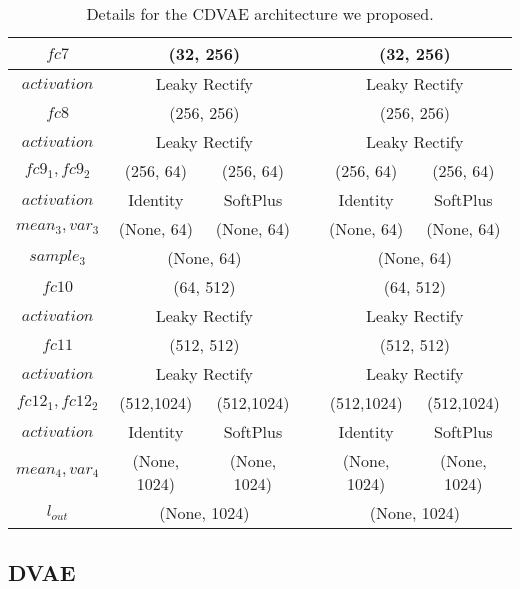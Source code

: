 \documentclass[10pt,twocolumn,letterpaper]{article}
\begin{document}
\begin{table*}
{\begin{tabular}{ | c | c | c | c | c | c |}
  \hline
   $fc7$ & \multicolumn{2}{|c|}{(32, 256)} &  & \multicolumn{2}{|c|}{(32, 256)} \\
  \hline
   $activation$ & \multicolumn{2}{|c|}{Leaky Rectify} &  & \multicolumn{2}{|c|}{Leaky Rectify} \\
  \hline
   $fc8$ & \multicolumn{2}{|c|}{(256, 256)} &  & \multicolumn{2}{|c|}{(256, 256)} \\
  \hline
   $activation$ & \multicolumn{2}{|c|}{Leaky Rectify} &  & \multicolumn{2}{|c|}{Leaky Rectify} \\
  \hline
   $fc9_1, fc9_2$ & (256, 64) & (256, 64) &  &  (256, 64) & (256, 64) \\
  \hline
   $activation$ & Identity & SoftPlus &  & Identity & SoftPlus \\
  \hline
   $mean_3, var_3$ & (None, 64) & (None, 64) &  &  (None, 64) & (None, 64) \\
  \hline
   $sample_3$ & \multicolumn{2}{|c|}{(None, 64)}  &  &  \multicolumn{2}{|c|}{(None, 64)} \\
  \hline
   $fc10$ & \multicolumn{2}{|c|}{(64, 512)} &  & \multicolumn{2}{|c|}{(64, 512)} \\
  \hline
   $activation$ & \multicolumn{2}{|c|}{Leaky Rectify} &  & \multicolumn{2}{|c|}{Leaky Rectify} \\
  \hline
   $fc11$ & \multicolumn{2}{|c|}{(512, 512)} &  & \multicolumn{2}{|c|}{(512, 512)} \\
  \hline
   $activation$ & \multicolumn{2}{|c|}{Leaky Rectify} &  & \multicolumn{2}{|c|}{Leaky Rectify} \\
  \hline
   $fc12_1, fc12_2$ & (512,1024) & (512,1024) &  & (512,1024) & (512,1024) \\
  \hline
   $activation$ & Identity & SoftPlus &  & Identity & SoftPlus \\
  \hline
   $mean_4, var_4$ & (None, 1024) & (None, 1024) &  &  (None, 1024) & (None, 1024) \\
  \hline
  $ l_{out}$ & \multicolumn{2}{|c|}{(None, 1024)} &  & \multicolumn{2}{|c|}{(None, 1024)} \\
  \hline
\end{tabular}
}
\vspace{2mm}
\label{architecture}
\caption{Details for the CDVAE architecture we proposed. }
\end{table*}

\subsection{DVAE}
\end{document}
